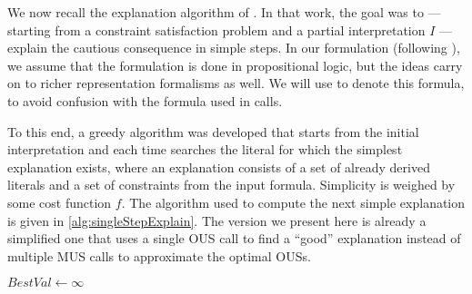 
We now recall the explanation algorithm of \citet{ecai/BogaertsGCG20}. 
In that work, the goal was to --- starting from a constraint satisfaction problem and a partial interpretation $I$ --- explain the cautious consequence in simple steps. 
In our formulation (following \citet{ecai/BogaertsGCG20}), we assume that the formulation is done in propositional logic, but the ideas carry on to richer representation formalisms as well. We will use \formulag to denote this formula, to avoid confusion with the formula \formula used in \omus calls.

To this end, a greedy algorithm was developed that starts from the initial interpretation and each time searches the literal for which the simplest explanation exists, where an explanation consists of a set of already derived literals and a set of constraints from the input formula. 
Simplicity is weighed by some cost function $f$. 
The algorithm used to compute the next simple explanation is given in \cref{alg:singleStepExplain}. 
The version we present here is already a simplified one that uses a single OUS call to find a ``good'' explanation instead of multiple MUS calls to approximate the optimal OUSs. 


% 
% 



\begin{algorithm}[ht]
$    \mathit{BestVal}\gets\infty$\;
    
    \caption{$\call{SingleStepExplain}(\formulag,f,I)$}
  \label{alg:singleStepExplain}
  \label{alg:explainSingleStep}
\end{algorithm}

